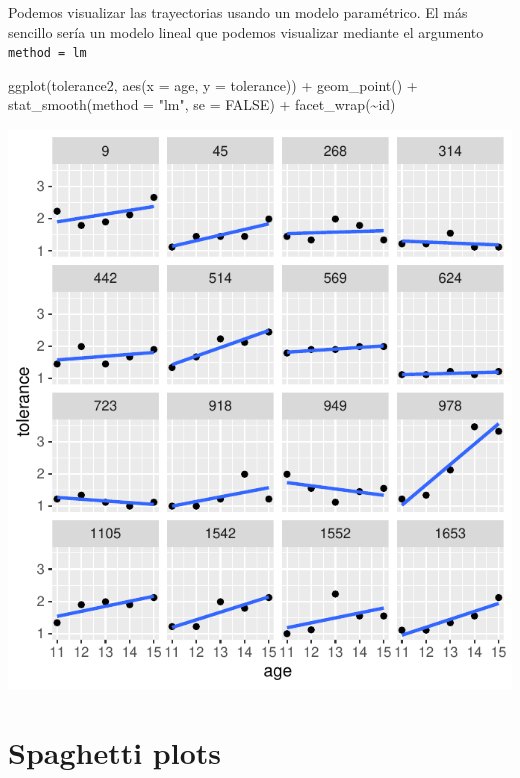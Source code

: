 \documentclass[
]{book}
\newenvironment{Shaded}{\begin{snugshade}}{\end{snugshade}}
\newcommand{\AttributeTok}[1]{\textcolor[rgb]{0.77,0.63,0.00}{#1}}
\newcommand{\ConstantTok}[1]{\textcolor[rgb]{0.00,0.00,0.00}{#1}}
\newcommand{\FunctionTok}[1]{\textcolor[rgb]{0.00,0.00,0.00}{#1}}
\newcommand{\NormalTok}[1]{#1}
\newcommand{\SpecialCharTok}[1]{\textcolor[rgb]{0.00,0.00,0.00}{#1}}
\newcommand{\StringTok}[1]{\textcolor[rgb]{0.31,0.60,0.02}{#1}}
\begin{document}
Podemos visualizar las trayectorias usando un modelo paramétrico. El más sencillo sería un modelo lineal que podemos visualizar mediante el argumento \texttt{method\ =\ \textquotesingle{}lm\textquotesingle{}}

\begin{Shaded}
\begin{Highlighting}[]
\FunctionTok{ggplot}\NormalTok{(tolerance2, }\FunctionTok{aes}\NormalTok{(}\AttributeTok{x =}\NormalTok{ age, }\AttributeTok{y =}\NormalTok{ tolerance)) }\SpecialCharTok{+}
  \FunctionTok{geom\_point}\NormalTok{() }\SpecialCharTok{+}
  \FunctionTok{stat\_smooth}\NormalTok{(}\AttributeTok{method =} \StringTok{"lm"}\NormalTok{, }\AttributeTok{se =} \ConstantTok{FALSE}\NormalTok{) }\SpecialCharTok{+}
  \FunctionTok{facet\_wrap}\NormalTok{(}\SpecialCharTok{\textasciitilde{}}\NormalTok{id)}
\end{Highlighting}
\end{Shaded}

\includegraphics{fig_out/unnamed-chunk-38-1.pdf}

\hypertarget{spaghetti-plots}{%
\section{Spaghetti plots}\label{spaghetti-plots}}
\end{document}
